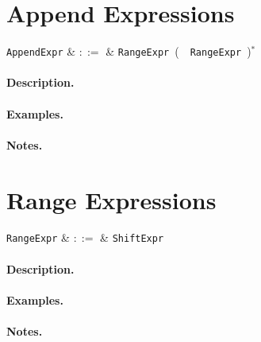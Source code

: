 \section{Append Expressions}
\label{c_expr_append}

\begin{syntax}
  \verb+AppendExpr+ & $::=$ & \verb+RangeExpr+\ \big(\ \token{++}\
  \verb+RangeExpr+\ \big)$^*$\\
\end{syntax}

\paragraph{Description.}

\paragraph{Examples.}

\paragraph{Notes.} 



\section{Range Expressions}
\label{c_expr_range}

\begin{syntax}
  \verb+RangeExpr+ & $::=$ & \verb+ShiftExpr+\ \\
\end{syntax}

\paragraph{Description.}

\paragraph{Examples.}

\paragraph{Notes.} 

